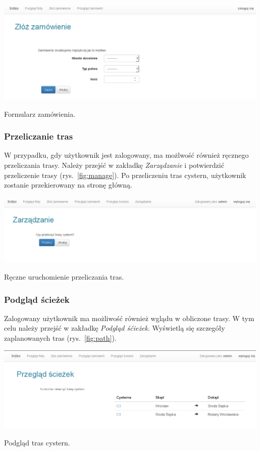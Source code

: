 \documentclass[11pt,a4paper,oneside]{mwart}
\begin{document}
\begin{wykres}[htbp]
  \centering
  \includegraphics[width=0.99\textwidth]{pics/order_form.png}
  \caption{Formularz zamówienia.}
  \label{fig:order_form}
\end{wykres}

\subsubsection{Przeliczanie tras}
W przypadku, gdy użytkownik jest zalogowany, ma możlwość również ręcznego przeliczania trasy. Należy przejść w zakładkę \emph{Zarządzanie} i potwierdzić przeliczenie trasy (rys.~\ref{fig:manage}). Po przeliczeniu tras cystern, użytkownik zostanie przekierowany na stronę główną.
\begin{wykres}[htbp]
  \centering
  \includegraphics[width=0.99\textwidth]{pics/manage.png}
  \caption{Ręczne uruchomienie przeliczania tras.}
  \label{fig:manage}
\end{wykres}

\subsubsection{Podgląd ścieżek}
Zalogowany użytkownik ma możliwość również wglądu w obliczone trasy. W tym celu należy przejść w zakładkę \emph{Podgląd śćieżek}. Wyświetlą się szczegóły zaplanowanych tras (rys.~\ref{fig:path}).
\begin{wykres}[htbp]
  \centering
  \includegraphics[width=0.99\textwidth]{pics/path.png}
  \caption{Podgląd tras cystern.}
  \label{fig:path}
\end{wykres}
\end{document}
